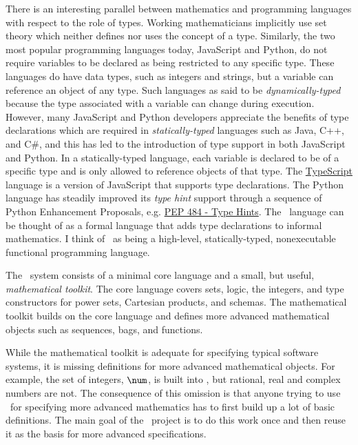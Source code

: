 \documentclass{amsart}
\begin{document}
There is an interesting parallel between mathematics and programming languages with respect to the role of types.
Working mathematicians implicitly use set theory which neither defines nor uses the concept of a type.
Similarly, the two most popular programming languages today, JavaScript and Python, do not require variables to be
declared as being restricted to any specific type.
These languages do have data types, such as integers and strings, but a variable can reference an object of any type.
Such languages as said to be \textit{dynamically-typed} because the type associated with a variable can change during execution.
However, many JavaScript and Python developers appreciate the benefits of type declarations which are required in 
\textit{statically-typed} languages such as Java, C++, and C\#, 
and this has led to the introduction of type support in both JavaScript and Python. 
In a statically-typed language, each variable is declared to be of a specific type and is only allowed to reference objects of that type.
The \href{https://www.typescriptlang.org}{TypeScript} language is a version of JavaScript that supports type declarations. 
The Python language has steadily improved its \textit{type hint} support through a sequence of Python
Enhancement Proposals, e.g. \href{https://peps.python.org/pep-0484/}{PEP 484 - Type Hints}.
The \ZN\ language can be thought of as a formal language that adds type declarations to informal mathematics.
I think of \ZN\ as being a high-level, statically-typed, nonexecutable functional programming language.

The \ZN\ system consists of a minimal core language and a small, but useful, \textit{mathematical toolkit}.
The core language covers sets, logic, the integers, and type constructors for power sets, Cartesian products, and schemas.
The mathematical toolkit builds on the core language and defines more advanced mathematical objects such as sequences, bags, and
functions.

While the mathematical toolkit is adequate for specifying typical software systems, it is missing definitions for more advanced
mathematical objects.
For example, the set of integers, $\num$, is built into \ZN, but rational, real and complex numbers are not.
The consequence of this omission is that anyone trying to use \ZN\ for specifying more advanced mathematics has to first build up
a lot of basic definitions.
The main goal of the \mathz\ project is to do this work once and then reuse it as the basis for more advanced specifications.
\end{document}
